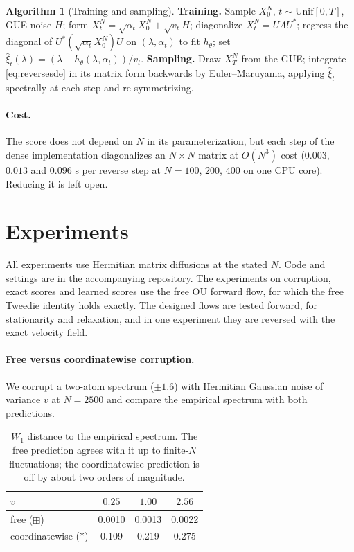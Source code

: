 \documentclass[11pt]{article}
\theoremstyle{plain}
\theoremstyle{definition}
\newtheorem{algorithmenv}[theorem]{Algorithm}
\theoremstyle{remark}
\begin{document}
\begin{algorithmenv}[Training and sampling]\label{alg:main}
\textbf{Training.} Sample $X_0^N$, $t\sim\mathrm{Unif}[0,T]$, GUE noise $H$; form
$X_t^N=\sqrt{\alpha_t}X_0^N+\sqrt{v_t}H$; diagonalize $X_t^N=U\Lambda U^*$; regress
the diagonal of $U^*(\sqrt{\alpha_t}X_0^N)U$ on $(\lambda,\alpha_t)$ to fit
$h_\theta$; set $\widehat\xi_t(\lambda)=(\lambda-h_\theta(\lambda,\alpha_t))/v_t$.
\textbf{Sampling.} Draw $X_T^N$ from the GUE; integrate \eqref{eq:reversesde} in its
matrix form backwards by Euler--Maruyama, applying $\widehat\xi_t$ spectrally at
each step and re-symmetrizing.
\end{algorithmenv}

\paragraph{Cost.} The score does not depend on $N$ in its parameterization, but each step of the dense implementation
diagonalizes an $N\times N$ matrix at $O(N^3)$ cost ($0.003$, $0.013$ and $0.096$ s per reverse step at $N=100$, $200$, $400$ on one CPU core).
Reducing it is left open.

\section{Experiments}\label{sec:experiments}

All experiments use Hermitian matrix diffusions at the stated $N$. Code and settings are in the
accompanying repository. The
experiments on corruption, exact scores and learned scores use the free OU forward flow, for
which the free Tweedie identity holds exactly. The designed flows are tested forward, for
stationarity and relaxation, and in one experiment they are reversed with the exact velocity
field.

\paragraph{Free versus coordinatewise corruption.} We corrupt a two-atom spectrum ($\pm1.6$)
with Hermitian Gaussian noise of variance $v$ at $N=2500$ and compare the empirical spectrum with
both predictions.

\begin{table}[h]
\centering
\caption{$W_1$ distance to the empirical spectrum. The free prediction agrees with it up to
finite-$N$ fluctuations; the coordinatewise prediction is off by about two orders of magnitude.}
\label{tab:freevsclassical}
\begin{tabular}{lccc}
\toprule
$v$ & $0.25$ & $1.00$ & $2.56$ \\
\midrule
free ($\boxplus$) & 0.0010 & 0.0013 & 0.0022 \\
coordinatewise ($*$) & 0.109 & 0.219 & 0.275 \\
\bottomrule
\end{tabular}
\end{table}
\end{document}
